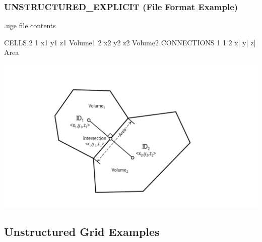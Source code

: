 \documentclass{beamer}
\begin{document}
\begin{frame}\frametitle{UNSTRUCTURED\_EXPLICIT (File Format Example)}

\begin{minipage}[t]{0.48\linewidth}
\vspace{0.4in}
.uge file contents
\begin{semiverbatim}
CELLS 2
1 x1 y1 z1 Volume1
2 x2 y2 z2 Volume2
CONNECTIONS 1
1 2 x| y| z| Area
\end{semiverbatim}
\end{minipage}
\hfill
\begin{minipage}[t]{0.48\linewidth}
\vspace{0.01in}
\hspace{-.5in}
\includegraphics[width=1.3\linewidth]{./voronoi_dual}
\end{minipage}

\end{frame}

\subsection{Unstructured Grid Examples}
\end{document}
